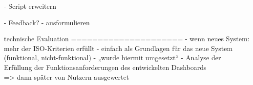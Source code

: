 - Script erweitern

- Feedback?
- ausformulieren

technische Evaluation
=====================
- wenn neues System: mehr der ISO-Kriterien erfüllt
- einfach als Grundlagen für das neue System (funktional, nicht-funktional)
- „wurde hiermit umgesetzt“
- Analyse der Erfüllung der Funktionsanforderungen des entwickelten Dashboards\\

=> dann später von Nutzern ausgewertet